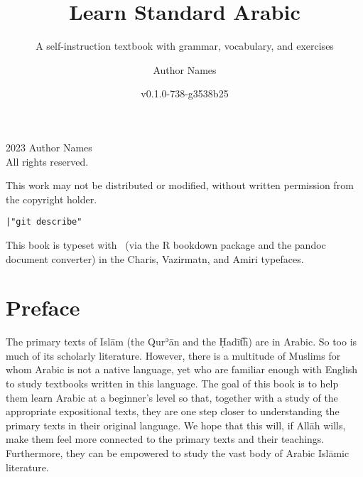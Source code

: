 \documentclass[
  10pt,
]{book}
\title{Learn Standard Arabic}
\subtitle{A self-instruction textbook with grammar, vocabulary, and exercises}
\author{Author Names}
\date{v0.1.0-738-g3538b25}
\newcommand{\gitTag}{|"git describe"}
\begin{document}
\maketitle

\thispagestyle{empty}
\begingroup
\footnotesize
\parindent 0pt
\parskip \baselineskip
\textcopyright{} 2023 Author Names \\
All rights reserved.

    This work may not be distributed or modified, without written permission from the copyright holder.

\texttt{\gitTag}

This book is typeset with \XeLaTeX\ (via the R bookdown package and the pandoc document converter)
in the Charis, Vazirmatn, and Amiri typefaces.


\vfill




\endgroup
\clearpage

\newpage
\pagestyle{mymainstyle}
\begingroup
\setlength{\cftbeforechapskip}{-3pt}
\endgroup


{
\setcounter{tocdepth}{1}
\tableofcontents
}
\chapter*{Preface}\label{preface}


\begin{center}
\end{center}

The primary texts of Islām (the Qurʾān and the Ḥadīt͡h) are in Arabic. So too is much of its scholarly literature. However, there is a multitude of Muslims for whom Arabic is not a native language, yet who are familiar enough with English to study textbooks written in this language. The goal of this book is to help them learn Arabic at a beginner's level so that, together with a study of the appropriate expositional texts, they are one step closer to understanding the primary texts in their original language. We hope that this will, if Allāh wills, make them feel more connected to the primary texts and their teachings. Furthermore, they can be empowered to study the vast body of Arabic Islāmic literature.
\end{document}
